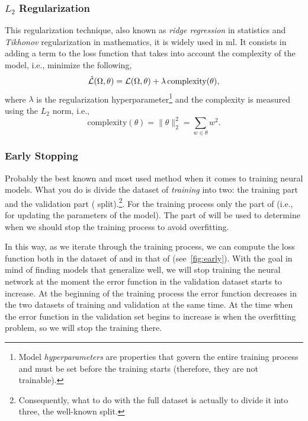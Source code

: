 \subsubsection{\(L_2\) Regularization}

This regularization technique, also known as \emph{ridge
  regression} in statistics and
\emph{Tikhonov} regularization in mathematics, it is
widely used in \gls{ml}. It consists in adding a term to the loss function that
takes into account the complexity of the model, i.e., minimize the following,
\begin{equation}
  \hat{\mathcal{L}}(\Omega, \theta) =
  \mathcal{L}(\Omega, \theta) + \lambda\,\text{complexity}(\theta),
\end{equation}
where \(\lambda\) is the regularization hyperparameter\footnote{Model
  \emph{hyperparameters} are properties that govern the entire training process
  and must be set before the training starts (therefore, they are not
  trainable).} and the complexity is measured using the
\(L_2\) norm, i.e.,
\begin{equation}
  \text{complexity}(\theta) = \lVert\theta\rVert_2^2 = \sum_{w \in \theta} w^2.
\end{equation}

\subsubsection{Early Stopping}

Probably the best known and most used method when it comes to training neural
models. What you do is divide the dataset of \emph{training} into two: the
training part and the validation part (
split).\footnote{Consequently, what to do with the full dataset is actually to
  divide it into three, the well-known  split.}. For the
training process only the part of  (i.e., for updating the
parameters of the model). The part of  will be used to determine when
we should stop the training process to avoid overfitting.

In this way, as we iterate through the training process, we can compute the
loss function both in the dataset of  and in that of 
(see\ \vref{fig:early}). With the goal in mind of finding models that generalize
well, we will stop training the neural network at the moment the error function
in the validation dataset starts to increase. At the beginning of the training
process the error function decreases in the two datasets of training and
validation at the same time. At the time when the error function in the
validation set begins to increase is when the overfitting problem, so we will
stop the training there.

